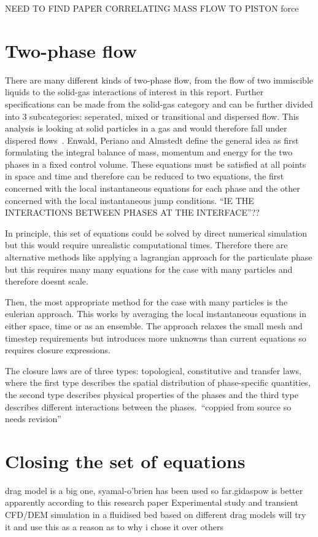 NEED TO FIND PAPER CORRELATING MASS FLOW TO PISTON force
\newpage
\section{Two-phase flow}
There are many different kinds of two-phase flow, from the flow of two immiscible liquids to the solid-gas interactions of interest in this report. Further specifications can be made from the solid-gas category and can be further divided into 3 subcategories: seperated, mixed or transitional and dispersed flow. This analysis is looking at solid particles in a gas and would therefore fall under dispered flows~\cite{enwald1996eulerian}. Enwald, Periano and Almstedt define the general idea as first formulating the integral balance of mass, momentum and energy for the two phases in a fixed control volume. These equations must be satisfied at all points in space and time and therefore can be reduced to two equations, the first concerned with the local instantaneous equations for each phase and the other concerned with the local instantaneous jump conditions. ``IE THE INTERACTIONS BETWEEN PHASES AT THE INTERFACE''??

In principle, this set of equations could be solved by direct numerical simulation but this would require unrealistic computational times. Therefore there are alternative methods like applying a lagrangian approach for the particulate phase but this requires many many equations for the case with many particles and therefore doesnt scale.

Then, the most appropriate method for the case with many particles is the eulerian approach. This works by averaging the local instantaneous equations in either space, time or as an ensemble. The approach relaxes the small mesh and timestep requirements but introduces more unknowns than current equations so requires closure expressions.

The closure laws are of three types: topological, constitutive and transfer laws, where the first type describes the spatial distribution of phase-specific quantities, the second type describes physical properties of the phases and the third type describes different interactions between the phases.~``coppied from source so needs revision''

\newpage
\section{Closing the set of equations}
drag model is a big one, syamal-o'brien has been used so far.gidaspow is better apparently according to this research paper Experimental study and transient CFD/DEM
simulation in a fluidised bed based on different
drag models
will try it and use this as a reason as to why i chose it over others

